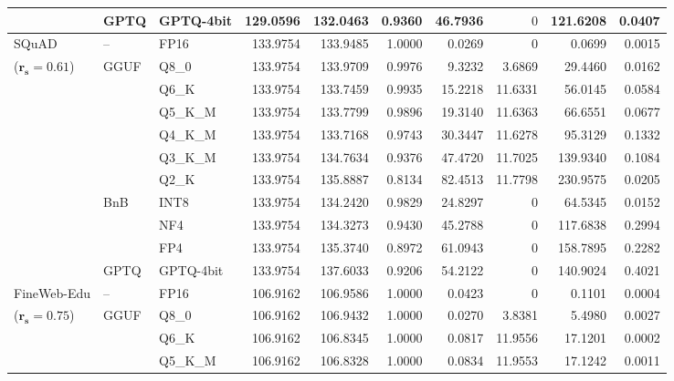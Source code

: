 \begin{longtable}{ll l rrrrrrr}
 & GPTQ & GPTQ-4bit & 129.0596 & 132.0463 & \cellcolor{red!18} 0.9360 & \cellcolor{red!18} 46.7936 & \cellcolor{cyan!12} $0$ & \cellcolor{red!18} 121.6208 & \cellcolor{red!18} 0.0407 \\
\midrule
SQuAD & -- & FP16 & 133.9754 & 133.9485 & 1.0000 & 0.0269 & \cellcolor{cyan!12} $0$ & 0.0699 & 0.0015 \\
{\small ($\mathbf{r_s{=}0.61}$)} & GGUF & Q8\_0 & 133.9754 & 133.9709 & 0.9976 & 9.3232 & 3.6869 & 29.4460 & 0.0162 \\
 &  & Q6\_K & 133.9754 & 133.7459 & 0.9935 & 15.2218 & 11.6331 & 56.0145 & 0.0584 \\
 &  & Q5\_K\_M & 133.9754 & 133.7799 & 0.9896 & 19.3140 & 11.6363 & 66.6551 & 0.0677 \\
 &  & Q4\_K\_M & 133.9754 & 133.7168 & 0.9743 & 30.3447 & 11.6278 & 95.3129 & 0.1332 \\
 &  & Q3\_K\_M & 133.9754 & 134.7634 & \cellcolor{red!18} 0.9376 & \cellcolor{red!18} 47.4720 & 11.7025 & \cellcolor{red!18} 139.9340 & \cellcolor{red!18} 0.1084 \\
 &  & Q2\_K & 133.9754 & 135.8887 & \cellcolor{red!18} 0.8134 & \cellcolor{red!18} 82.4513 & 11.7798 & \cellcolor{red!18} 230.9575 & \cellcolor{red!18} 0.0205 \\
 & BnB & INT8 & 133.9754 & 134.2420 & 0.9829 & 24.8297 & \cellcolor{cyan!12} $0$ & 64.5345 & 0.0152 \\
 &  & NF4 & 133.9754 & 134.3273 & \cellcolor{red!18} 0.9430 & \cellcolor{red!18} 45.2788 & \cellcolor{cyan!12} $0$ & \cellcolor{red!18} 117.6838 & \cellcolor{red!18} 0.2994 \\
 &  & FP4 & 133.9754 & 135.3740 & \cellcolor{red!18} 0.8972 & \cellcolor{red!18} 61.0943 & \cellcolor{cyan!12} $0$ & \cellcolor{red!18} 158.7895 & \cellcolor{red!18} 0.2282 \\
 & GPTQ & GPTQ-4bit & 133.9754 & 137.6033 & \cellcolor{red!18} 0.9206 & \cellcolor{red!18} 54.2122 & \cellcolor{cyan!12} $0$ & \cellcolor{red!18} 140.9024 & \cellcolor{red!18} 0.4021 \\
\midrule
FineWeb-Edu & -- & FP16 & 106.9162 & 106.9586 & 1.0000 & 0.0423 & \cellcolor{cyan!12} $0$ & 0.1101 & 0.0004 \\
{\small ($\mathbf{r_s{=}0.75}$)} & GGUF & Q8\_0 & 106.9162 & 106.9432 & 1.0000 & 0.0270 & 3.8381 & 5.4980 & 0.0027 \\
 &  & Q6\_K & 106.9162 & 106.8345 & 1.0000 & 0.0817 & 11.9556 & 17.1201 & 0.0002 \\
 &  & Q5\_K\_M & 106.9162 & 106.8328 & 1.0000 & 0.0834 & 11.9553 & 17.1242 & 0.0011 \\

\end{longtable}
